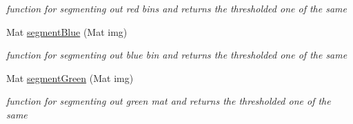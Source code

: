 \begin{DoxyCompactItemize}
\begin{DoxyCompactList}\small\item\em function for segmenting out red bins and returns the thresholded one of the same \end{DoxyCompactList}\item 
Mat \hyperlink{classBinsTask_a5bdedfc0921b5ec486c12ffa53398b20}{segment\+Blue} (Mat img)
\begin{DoxyCompactList}\small\item\em function for segmenting out blue bin and returns the thresholded one of the same \end{DoxyCompactList}\item 
Mat \hyperlink{classBinsTask_ad53d8e8e2152cdb8fdd80ca379a1377c}{segment\+Green} (Mat img)
\begin{DoxyCompactList}\small\item\em function for segmenting out green mat and returns the thresholded one of the same \end{DoxyCompactList}\end{DoxyCompactItemize}
